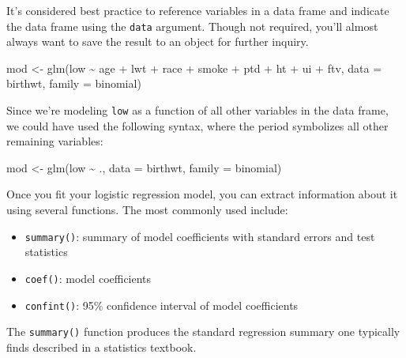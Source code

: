 \documentclass[
]{book}
\newenvironment{Shaded}{\begin{snugshade}}{\end{snugshade}}
\newcommand{\AttributeTok}[1]{\textcolor[rgb]{0.77,0.63,0.00}{#1}}
\newcommand{\FunctionTok}[1]{\textcolor[rgb]{0.00,0.00,0.00}{#1}}
\newcommand{\NormalTok}[1]{#1}
\newcommand{\OtherTok}[1]{\textcolor[rgb]{0.56,0.35,0.01}{#1}}
\newcommand{\SpecialCharTok}[1]{\textcolor[rgb]{0.00,0.00,0.00}{#1}}
\providecommand{\tightlist}{%
  \setlength{\itemsep}{0pt}\setlength{\parskip}{0pt}}
\begin{document}
It's considered best practice to reference variables in a data frame and indicate the data frame using the \texttt{data} argument. Though not required, you'll almost always want to save the result to an object for further inquiry.

\begin{Shaded}
\begin{Highlighting}[]
\NormalTok{mod }\OtherTok{\textless{}{-}} \FunctionTok{glm}\NormalTok{(low }\SpecialCharTok{\textasciitilde{}}\NormalTok{ age }\SpecialCharTok{+}\NormalTok{ lwt }\SpecialCharTok{+}\NormalTok{ race }\SpecialCharTok{+} 
\NormalTok{             smoke }\SpecialCharTok{+}\NormalTok{ ptd }\SpecialCharTok{+}\NormalTok{ ht }\SpecialCharTok{+} 
\NormalTok{             ui }\SpecialCharTok{+}\NormalTok{ ftv, }
           \AttributeTok{data =}\NormalTok{ birthwt, }\AttributeTok{family =}\NormalTok{ binomial)}
\end{Highlighting}
\end{Shaded}

Since we're modeling \texttt{low} as a function of all other variables in the data frame, we could have used the following syntax, where the period symbolizes all other remaining variables:

\begin{Shaded}
\begin{Highlighting}[]
\NormalTok{mod }\OtherTok{\textless{}{-}} \FunctionTok{glm}\NormalTok{(low }\SpecialCharTok{\textasciitilde{}}\NormalTok{ ., }\AttributeTok{data =}\NormalTok{ birthwt, }\AttributeTok{family =}\NormalTok{ binomial)}
\end{Highlighting}
\end{Shaded}

Once you fit your logistic regression model, you can extract information about it using several functions. The most commonly used include:

\begin{itemize}
\tightlist
\item
  \texttt{summary()}: summary of model coefficients with standard errors and test statistics
\item
  \texttt{coef()}: model coefficients
\item
  \texttt{confint()}: 95\% confidence interval of model coefficients
\end{itemize}

The \texttt{summary()} function produces the standard regression summary one typically finds described in a statistics textbook.
\end{document}
